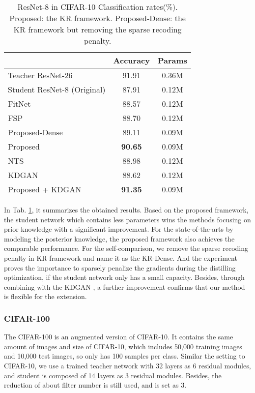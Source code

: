\documentclass[10pt,twocolumn,letterpaper]{article}
\begin{document}
\begin{table}[h]
\begin{center}
\begin{tabular}{l|c|c}
\hline
 & Accuracy & Params\\
\hline
Teacher ResNet-26 & 91.91 &  0.36M\\
Student ResNet-8 (Original) & 87.91 &  0.12M\\
FitNet \cite{Romero2014FitNets} & 88.57 &  0.12M\\
FSP \cite{yim2017gift} & 88.70 &  0.12M\\
Proposed-Dense & 89.11 &  0.09M\\
Proposed & \textbf{90.65} &  0.09M\\
NTS \cite{huang2017like} & 88.98 &  0.12M\\
KDGAN \cite{wang2018kdgan} & 88.62 &  0.12M\\
Proposed + KDGAN \cite{wang2018kdgan} & \textbf{91.35} &  0.09M\\
\hline
\end{tabular}
\end{center}
\caption{ResNet-8 in CIFAR-10 Classification rates(\%). Proposed: the KR framework. Proposed-Dense: the KR framework but removing the sparse recoding penalty.}
\label{tab:cifar10}
\end{table}

In Tab. \ref{tab:cifar10},
it summarizes the obtained results.
Based on the proposed framework,
the student network which contains less parameters
wins the methods \cite{Romero2014FitNets, yim2017gift}
focusing on prior knowledge with a significant improvement.
For the state-of-the-arts \cite{huang2017like, wang2018kdgan} by modeling the posterior knowledge,
the proposed framework also achieves the comparable performance.
For the self-comparison,
we remove the sparse recoding penalty in KR framework and name it as the KR-Dense.
And the experiment proves
the importance to sparsely penalize the gradients during the distilling optimization,
if the student network only has a small capacity.
Besides,
through combining with the KDGAN \cite{wang2018kdgan},
a further improvement confirms that
our method is flexible for the extension.


\subsubsection{CIFAR-100}
The CIFAR-100 is an augmented version of CIFAR-10.
It contains the same amount of images and size of CIFAR-10,
which includes 50,000 training images and 10,000 test images,
so only has 100 samples per class.
Similar the setting to CIFAR-10,
we use a trained teacher network with 32 layers as 6 residual modules,
and student is composed of 14 layers as 3 residual modules.
Besides,
the reduction of about  filter number is still used,
and  is set as 3.
\end{document}
